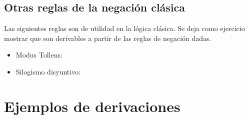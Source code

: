 \documentclass[11pt,letterpaper]{article}
\begin{document}




\subsection{Otras reglas de la negación clásica}

Las siguientes reglas son de utilidad en la lógica clásica. Se deja como 
ejercicio mostrar que son derivables a partir de las reglas de negación dadas.

\begin{itemize}
\item Modus Tollens:
\begin{mathpar}
\end{mathpar}
\item Silogismo disyuntivo:
\begin{mathpar}
\end{mathpar}
\end{itemize}


\section{Ejemplos de derivaciones}
\end{document}
